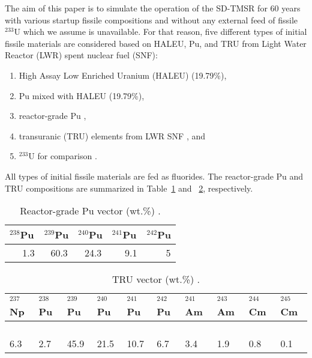 The aim of this paper is to simulate the  
operation of the \gls{SD-TMSR} for 60 years with various startup fissile 
compositions and without any external feed of fissile $^{233}$U which we 
assume is unavailable. For that reason, five different types of initial 
fissile materials are considered based on \gls{HALEU}, Pu, and \gls{TRU} from Light Water
Reactor (LWR) spent nuclear fuel (SNF):
\begin{enumerate}[label=(\alph*)]
	\item High Assay Low Enriched Uranium (HALEU) (19.79\%),
	\item Pu mixed with \gls{HALEU} (19.79\%),
	\item reactor-grade Pu \cite{marka1993explosive},
	\item transuranic (TRU) elements from LWR SNF \cite{de2000scenarios}, and
	\item $^{233}$U for comparison \cite{ashraf2019whole_core}.
\end{enumerate}
All types of initial fissile materials are fed as fluorides.
The reactor-grade Pu and \gls{TRU} compositions are summarized in 
Table~\ref{tab:table2} and ~\ref{tab:table3}, respectively.

\begin{table} %
	\centering
	\caption{Reactor-grade Pu vector (wt.\%) \cite{marka1993explosive}.}
	\vspace{0.1in}
	\begin{tabularx}{\textwidth}{X X X X X}
		\hline
		$^{238}$Pu & $^{239}$Pu & $^{240}$Pu & $^{241}$Pu & $^{242}$Pu \\
		\hline
		$ $ $ $ $ $ $ $ $ $1.3 &$ $ $ $ $ $60.3&$ $ $ $ $ $24.3&$ $ $ $ $ $ $ $ $ $9.1&$ $ $ $ $ $ $ $ $ $ $ $ $ $5 \\
		\hline
	\end{tabularx}
	\label{tab:table2}
\end{table}

\begin{table} %
	\centering
	\caption{\gls{TRU} vector (wt.\%) \cite{de2000scenarios}.}
	\vspace{0.1in}
	\begin{tabularx}{\textwidth}{X X X X X X X X X X}
		\hline
		$^{237}$Np&$^{238}$Pu & $^{239}$Pu & $^{240}$Pu & $^{241}$Pu & $^{242}$Pu&$^{241}$Am &$^{243}$Am&$^{244}$Cm &$^{245}$Cm\\
		\hline
		$ $ $ $ $ $ $ $ $ $6.3&$ $ $ $ $ $ $ $ $ $2.7& $ $ $ $ $ $45.9& $ $ $ $ $ $21.5& $ $ $ $ $ $10.7&$ $ $ $ $ $ $ $ $ $6.7&$ $ $ $ $ $ $ $ $ $3.4&$ $ $ $ $ $ $ $ $ $1.9&$ $ $ $ $ $ $ $ $ $$ $0.8&$ $ $ $ $ $ $ $ $ $0.1 \\
		\hline
	\end{tabularx}
	\label{tab:table3}
\end{table}

